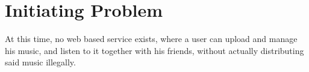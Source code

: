 \section{Initiating Problem}
At this time, no web based service exists, where a user can upload and manage his music, and listen to it together with his friends,
without actually distributing said music illegally.